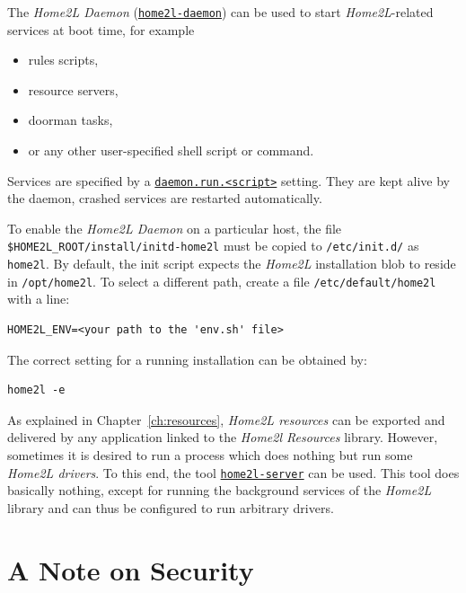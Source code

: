 \documentclass[12pt,english,parskip=half]{scrreprt}
\newcommand{\idx}[1]{#1\index{#1}}
\newcommand{\envref}[1]{\hyperref[env:#1]{\texttt{#1}}}        %
\newcommand{\toolref}[1]{\hyperref[tool:#1]{\texttt{\idx{#1}}}}
\begin{document}
The \emph{Home2L Daemon} (\toolref{home2l-daemon}) can be used to start
\emph{Home2L}-related services at boot time, for example

\begin{itemize}
\item
  rules scripts,
\item
  resource servers,
\item
  doorman tasks,
\item
  or any other user-specified shell script or command.
\end{itemize}

Services are specified by a \envref{daemon.run.<script>} setting.
They are kept alive by the daemon, crashed services are restarted automatically.

To enable the \emph{Home2L Daemon} on a particular host, the file
\texttt{\$HOME2L\_ROOT/install/initd-home2l} must be copied to
\texttt{/etc/init.d/} as \texttt{home2l}. By default, the init
script expects the \emph{Home2L} installation blob to reside in
\texttt{/opt/home2l}. To select a different path, create a file
\texttt{/etc/default/home2l} with a line:

\begin{lstlisting}
HOME2L_ENV=<your path to the 'env.sh' file>
\end{lstlisting}

The correct setting for a running installation can be obtained by:

\begin{lstlisting}
home2l -e
\end{lstlisting}

As explained in Chapter~\ref{ch:resources}, \emph{Home2L resources} can be exported
and delivered by any application linked to the \emph{Home2l Resources} library.
However, sometimes it is desired to run a process which does nothing but run some
\emph{Home2L drivers}. To this end, the tool \toolref{home2l-server} can be used.
This tool does basically nothing, except for running the background services
of the \emph{Home2L} library and can thus be configured to run arbitrary drivers.





\section{A Note on Security}
\label{sec:security}
\end{document}
